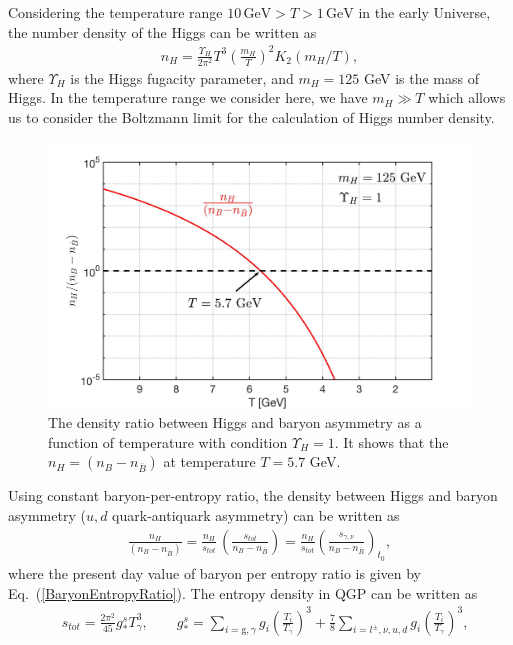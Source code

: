 Considering the temperature range $10\,\mathrm{GeV}>T>1\,\mathrm{GeV}$ in the early Universe, the number density of the Higgs can be written as
\begin{align}
n_{H}=\frac{\Upsilon_H}{2\pi^2}T^3\left(\frac{m_H}{T}\right)^2 K_2(m_H/T),
\end{align}
where $\Upsilon_H$ is the Higgs fugacity parameter, and $m_H=125$ GeV is the mass of Higgs. In the temperature range we consider here, we have $m_H\gg T$ which allows us to consider the Boltzmann limit for the calculation of Higgs number density.
\begin{figure}[ht]
\begin{center}
\includegraphics[width=\textwidth]{./plots/HiggsDensityRatio}
\caption{The density ratio between Higgs and baryon asymmetry as a function of temperature with condition $\Upsilon_H=1$. It shows that the $n_H=(n_B-n_{\bar{B}})$ at temperature $T=5.7$ GeV.}
\label{HiggsDensity_fig}
\end{center}
\end{figure}
Using constant baryon-per-entropy ratio, the density between Higgs and baryon asymmetry ($u,d$ quark-antiquark asymmetry) can be written as
\begin{align}
\frac{n_H}{(n_B-n_{\bar{B}})}=\frac{n_{H}}{s_{tot}}\,\left(\frac{s_{tot}}{n_B-n_{\bar{B}}}\right)=
\frac{n_{H}}{s_{tot}}\left(\frac{s_{\gamma,\nu}}{n_B-n_{\bar{B}}}\right)_{\!t_0},
\end{align}
where the present day value of baryon per entropy ratio is given by Eq.~(\ref{BaryonEntropyRatio}). The entropy density in QGP can be written as
\begin{align}
    &s_{tot}=\frac{2\pi^2}{45}g^s_\ast T_\gamma^3,\qquad g^s_\ast=\sum_{i=\mathrm{g},\gamma}g_i\left({\frac{T_i}{T_\gamma}}\right)^3+\frac{7}{8}\sum_{i=l^\pm,\nu,u,d}g_i\left({\frac{T_i}{T_\gamma}}\right)^3,
\end{align}

